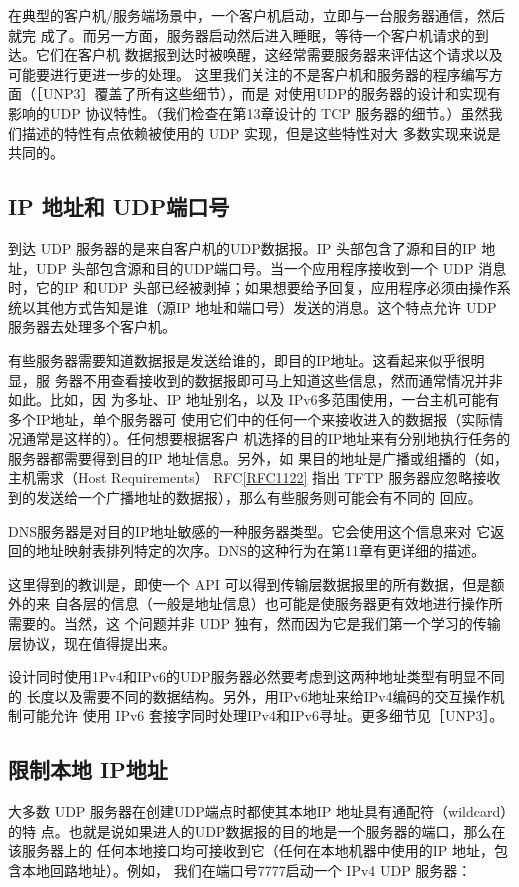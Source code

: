 在典型的客户机/服务端场景中，一个客户机启动，立即与一台服务器通信，然后就完
成了。而另一方面，服务器启动然后进入睡眠，等待一个客户机请求的到达。它们在客户机
数据报到达时被唤醒，这经常需要服务器来评估这个请求以及可能要进行更进一步的处理。
这里我们关注的不是客户机和服务器的程序编写方面（［UNP3］覆盖了所有这些细节），而是
对使用UDP的服务器的设计和实现有影响的UDP 协议特性。（我们检查在第13章设计的
TCP 服务器的细节。）虽然我们描述的特性有点依赖被使用的 UDP 实现，但是这些特性对大
多数实现来说是共同的。

\subsection{IP 地址和 UDP端口号}
到达 UDP 服务器的是来自客户机的UDP数据报。IP 头部包含了源和目的IP 地址，UDP
头部包含源和目的UDP端口号。当一个应用程序接收到一个 UDP 消息时，它的IP 和UDP
头部已经被剥掉；如果想要给予回复，应用程序必须由操作系统以其他方式告知是谁（源IP
地址和端口号）发送的消息。这个特点允许 UDP 服务器去处理多个客户机。

有些服务器需要知道数据报是发送给谁的，即目的IP地址。这看起来似乎很明显，服
务器不用查看接收到的数据报即可马上知道这些信息，然而通常情况并非如此。比如，因
为多址、IP 地址别名，以及 IPv6多范围使用，一台主机可能有多个IP地址，单个服务器可
使用它们中的任何一个来接收进入的数据报（实际情况通常是这样的）。任何想要根据客户
机选择的目的IP地址来有分别地执行任务的服务器都需要得到目的IP 地址信息。另外，如
果目的地址是广播或组播的（如，主机需求（Host Requirements）
RFC\href{https://www.rfc-editor.org/rfc/rfc1122}{[RFC1122]} 指出 TFTP
服务器应忽略接收到的发送给一个广播地址的数据报），那么有些服务则可能会有不同的
回应。

\begin{tcolorbox}
  DNS服务器是对目的IP地址敏感的一种服务器类型。它会使用这个信息来对
  它返回的地址映射表排列特定的次序。DNS的这种行为在第11章有更详细的描述。
\end{tcolorbox}

这里得到的教训是，即使一个 API 可以得到传输层数据报里的所有数据，但是额外的来
自各层的信息（一般是地址信息）也可能是使服务器更有效地进行操作所需要的。当然，这
个问题并非 UDP 独有，然而因为它是我们第一个学习的传输层协议，现在值得提出来。

设计同时使用1Pv4和IPv6的UDP服务器必然要考虑到这两种地址类型有明显不同的
长度以及需要不同的数据结构。另外，用IPv6地址来给IPv4编码的交互操作机制可能允许
使用 IPv6 套接字同时处理IPv4和IPv6寻址。更多细节见［UNP3］。

\subsection{限制本地 IP地址}
大多数 UDP 服务器在创建UDP端点时都使其本地IP 地址具有通配符（wildcard）的特
点。也就是说如果进人的UDP数据报的目的地是一个服务器的端口，那么在该服务器上的
任何本地接口均可接收到它（任何在本地机器中使用的IP 地址，包含本地回路地址）。例如，
我们在端口号7777启动一个 IPv4 UDP 服务器：

